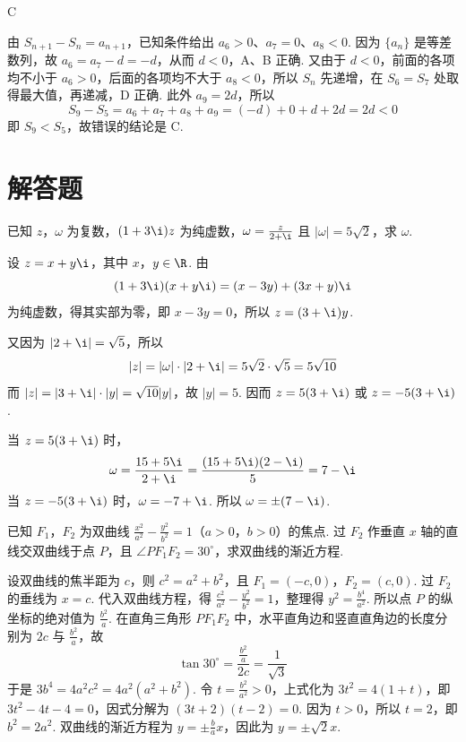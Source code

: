 \begin{answer}
C
\end{answer}

\begin{solution}
由 \(S_{n+1}-S_n=a_{n+1}\)，已知条件给出 \(a_6>0\)、\(a_7=0\)、\(a_8<0\). 因为 \(\{a_n\}\) 是等差数列，故 \(a_6=a_7-d=-d\)，从而 \(d<0\)，A、B 正确.
又由于 \(d<0\)，前面的各项均不小于 \(a_6>0\)，后面的各项均不大于 \(a_8<0\)，所以 \(S_n\) 先递增，在 \(S_6=S_7\) 处取得最大值，再递减，D 正确.
此外 \(a_9=2d\)，所以
\[
S_9-S_5=a_6+a_7+a_8+a_9=(-d)+0+d+2d=2d<0
\]
即 \(S_9<S_5\)，故错误的结论是 C.
\end{solution}

\section{解答题}
\begin{problem}
已知 \(z\)，\(\omega\) 为复数，\((1 + 3\i)z\) 为纯虚数，\(\omega = \frac{z}{2 + \i}\) 且 \(|\omega| = 5\sqrt{2}\)，求 \(\omega\).
\end{problem}

\begin{solution}
设 \(z=x+y\i\)，其中 \(x\)，\(y\in\R\). 由
\[
(1+3\i)(x+y\i)=(x-3y)+(3x+y)\i
\]
为纯虚数，得其实部为零，即 \(x-3y=0\)，所以 \(z=(3+\i)y\).

又因为 \(|2+\i|=\sqrt5\)，所以
\[
|z|=|\omega|\cdot|2+\i|=5\sqrt2\cdot\sqrt5=5\sqrt{10}
\]
而 \(|z|=|3+\i|\cdot|y|=\sqrt{10}|y|\)，故 \(|y|=5\). 因而 \(z=5(3+\i)\) 或 \(z=-5(3+\i)\).

当 \(z=5(3+\i)\) 时，
\[
\omega=\frac{15+5\i}{2+\i}=\frac{(15+5\i)(2-\i)}{5}=7-\i
\]
当 \(z=-5(3+\i)\) 时，\(\omega=-7+\i\). 所以 \(\omega=\pm(7-\i)\).
\end{solution}

\begin{problem}
已知 \(F_{1}\)，\(F_{2}\) 为双曲线 \(\frac{x^{2}}{a^{2}} - \frac{y^{2}}{b^{2}} = 1\)（\(a > 0\)，\(b > 0\)）的焦点. 过 \(F_{2}\) 作垂直 \(x\) 轴的直线交双曲线于点 \(P\)，且 \(\angle PF_{1}F_{2} = 30^{\circ}\)，求双曲线的渐近方程.
\end{problem}

\begin{solution}
设双曲线的焦半距为 \(c\)，则 \(c^2=a^2+b^2\)，且 \(F_1=(-c,0)\)，\(F_2=(c,0)\). 过 \(F_2\) 的垂线为 \(x=c\). 代入双曲线方程，得 \(\frac{c^2}{a^2}-\frac{y^2}{b^2}=1\)，整理得 \(y^2=\frac{b^4}{a^2}\).
所以点 \(P\) 的纵坐标的绝对值为 \(\frac{b^2}{a}\). 在直角三角形 \(PF_1F_2\) 中，水平直角边和竖直直角边的长度分别为 \(2c\) 与 \(\frac{b^2}{a}\)，故
\[
\tan30^\circ=\frac{\frac{b^2}{a}}{2c}=\frac1{\sqrt3}
\]
于是 \(3b^4=4a^2c^2=4a^2(a^2+b^2)\). 令 \(t=\frac{b^2}{a^2}>0\)，上式化为 \(3t^2=4(1+t)\)，即 \(3t^2-4t-4=0\)，因式分解为 \((3t+2)(t-2)=0\).
因为 \(t>0\)，所以 \(t=2\)，即 \(b^2=2a^2\). 双曲线的渐近方程为 \(y=\pm\frac{b}{a}x\)，因此为 \(y=\pm\sqrt2x\).
\end{solution}

